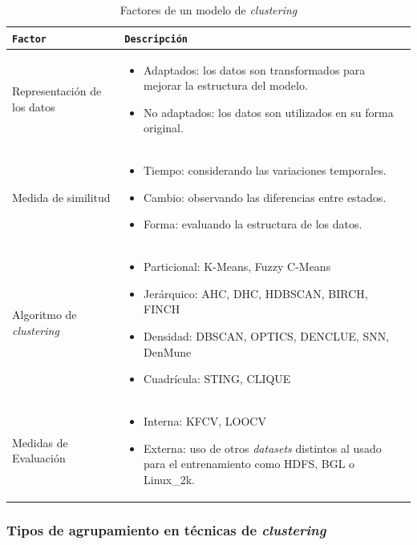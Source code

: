 \begin{table}[H]
\centering
\footnotesize
\renewcommand{\arraystretch}{0.9} 
\begin{tabularx}{\textwidth}{|>{\raggedright\arraybackslash}p{2.25cm}|>{\raggedright\arraybackslash}X|}
\hline
\rowcolor{graylight}\texttt{Factor} & \texttt{Descripción} \\
\hline
Representación de los datos & 
\begin{itemize}
    \item Adaptados: los datos son transformados para mejorar la estructura del modelo.
    \item No adaptados: los datos son utilizados en su forma original.
\end{itemize} \\
\hline
Medida de similitud & 
\begin{itemize}
    \item Tiempo: considerando las variaciones temporales.
    \item Cambio: observando las diferencias entre estados.
    \item Forma: evaluando la estructura de los datos.
\end{itemize} \\
\hline
Algoritmo de \textit{clustering} & 
\begin{itemize}
    \item Particional: K-Means, Fuzzy C-Means
    \item Jerárquico: \gls{AHC}, \gls{DHC}, \gls{HDBSCAN}, \gls{BIRCH}, \gls{FINCH}
    \item Densidad: \gls{DBSCAN}, \gls{OPTICS}, \gls{DENCLUE}, \gls{SNN}, \gls{DenMune}
    \item Cuadrícula: \gls{STING}, \gls{CLIQUE} 
\end{itemize} \\
\hline
Medidas de Evaluación &
\begin{itemize}
    \item Interna: \gls{KFCV}, \gls{LOOCV}
    \item Externa: uso de otros \textit{datasets} distintos al usado para el entrenamiento como \gls{HDFS}, \gls{BGL} o Linux\_2k.
\end{itemize} \\
\hline
\end{tabularx}
\caption{Factores de un modelo de \textit{clustering}}
\label{tab:clustering-factors}
\end{table}

\subsubsection*{Tipos de agrupamiento en técnicas de \textit{clustering}}

